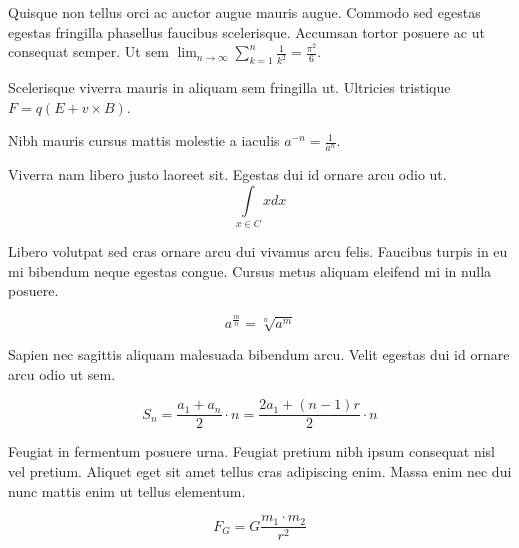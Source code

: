 \documentclass{article}
\begin{document}
Quisque non tellus orci ac auctor augue mauris augue. Commodo sed egestas egestas fringilla phasellus faucibus scelerisque. Accumsan tortor posuere ac ut consequat semper. Ut sem \begin{math}
	\lim_{n \to \infty}\sum_{k=1}^n \frac{1}{k^2}= \frac{\pi^2}{6}
\end{math}.\newline

Scelerisque viverra mauris in aliquam sem fringilla ut. Ultricies tristique $ F=q\left ( E+v \times B \right ) $.\newline

Nibh mauris cursus mattis molestie a iaculis \( a^{-n}=\frac{1}{a^{n}} \).\newline

Viverra nam libero justo laoreet sit. Egestas dui id ornare arcu odio ut.
\[ \int\limits_{x\in C}xdx \]

Libero volutpat sed cras ornare arcu dui vivamus arcu felis. Faucibus turpis in eu mi bibendum neque egestas congue. Cursus metus aliquam eleifend mi in nulla posuere.

$$ a^{\frac{m}{n}}=\sqrt[n]{a^{m}} $$

Sapien nec sagittis aliquam malesuada bibendum arcu. Velit egestas dui id ornare arcu odio ut sem. 

\begin{displaymath}
	S_{n}=\frac{a_{1}+a_{n}}{2}\cdot n=\frac{2a_{1}+(n-1)r}{2}\cdot n
\end{displaymath}

Feugiat in fermentum posuere urna. Feugiat pretium nibh ipsum consequat nisl vel pretium. Aliquet eget sit amet tellus cras adipiscing enim. Massa enim nec dui nunc mattis enim ut tellus elementum.

\begin{equation}
	F_{G}=G\frac{m_1\cdot m_2}{r^2}
\end{equation}
\end{document}
